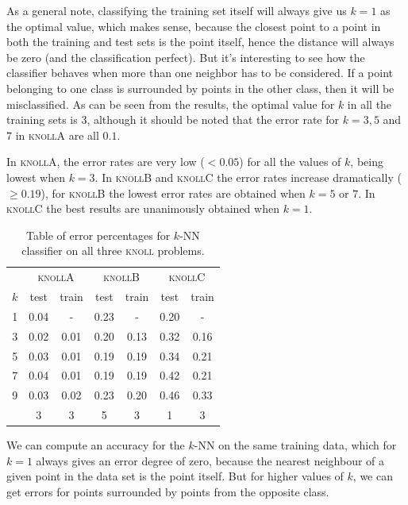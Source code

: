 \documentclass{article}
\newcommand{\knollA}{\textsc{knollA}\xspace}
\newcommand{\knollB}{\textsc{knollB}\xspace}
\newcommand{\knollC}{\textsc{knollC}\xspace}
\begin{document}
As a general note, classifying the training set itself will always
give us $k = 1$ as the optimal value, which makes sense, because the
closest point to a point in both the training and test sets is the
point itself, hence the distance will always be zero (and the
classification perfect). But it's interesting to see how the
classifier behaves when more than one neighbor has to be
considered. If a point belonging to one class is surrounded by points
in the other class, then it will be misclassified. As can be seen from
the results, the optimal value for $k$ in all the training sets is $3$,
although it should be noted that the error rate for $k = 3,5$ and $7$
in \knollA are all $0.1$.

In \knollA, the error rates are very low ($< 0.05$) for all the values of $k$,
being lowest when $k = 3$. In \knollB and \knollC the error rates
increase dramatically ($\geq 0.19$), for \knollB the lowest error rates are obtained
when $k = 5$ or $7$. In \knollC the best results are unanimously
obtained when $k = 1$.

\begin{table}
  \centering
  \begin{tabular}{c | c|c | c|c | c|c}
    \hfill & \multicolumn{2}{c|}{\knollA} & \multicolumn{2}{c|}{\knollB} & \multicolumn{2}{c}{\knollC}\\
    $k$ & test & train & test & train & test & train\\\hline
    1 & 0.04 &   -  & 0.23 &   -  & 0.20 &   - \\
    3 & 0.02 & 0.01 & 0.20 & 0.13 & 0.32 & 0.16\\
    5 & 0.03 & 0.01 & 0.19 & 0.19 & 0.34 & 0.21\\
    7 & 0.04 & 0.01 & 0.19 & 0.19 & 0.42 & 0.21\\
    9 & 0.03 & 0.02 & 0.23 & 0.20 & 0.46 & 0.33\\\hline\hline
    \hfill & 3 & 3  &   5  &   3  &   1  &   3 
  \end{tabular}
  \caption{Table of error percentages for $k$-NN classifier on all three \textsc{knoll} problems.}
  \label{tbl:results1}
\end{table}

We can compute an accuracy for the $k$-NN on the same training data, which for $k = 1$ always gives an error degree of zero, because the nearest neighbour of a given point in the data set is the point itself. But for higher values of $k$, we can get errors for points surrounded by points from the opposite class.
\end{document}

